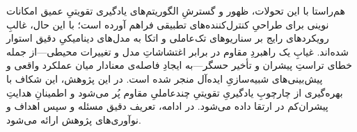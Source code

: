 هم‌راستا با این تحولات، ظهور و گسترشِ الگوریتم‌های یادگیری تقویتیِ عمیق امکانات نوینی برای طراحیِ کنترل‌کننده‌های تطبیقی فراهم آورده است؛ با این حال، غالبِ رویکردهای رایج بر سناریوهای تک‌عاملی و اتکا به مدل‌های دینامیکیِ دقیق استوار شده‌اند. غیابِ یک راهبردِ مقاوم در برابر اغتشاشاتِ مدل و تغییرات محیطی—از جمله خطای تراستِ پیشران و تأخیر حسگر—به ایجادِ فاصله‌ی معنادار میان عملکرد واقعی و پیش‌بینی‌های شبیه‌سازیِ ایده‌آل منجر شده است. در این پژوهش، این شکاف با بهره‌گیری از چارچوبِ یادگیریِ تقویتیِ چندعاملیِ مقاوم پُر می‌شود و اطمینانِ هدایتِ پیشران‌کم در  ارتقا داده می‌شود. در ادامه، تعریف دقیق مسئله و سپس اهداف و نوآوری‌های پژوهش ارائه می‌شود.
